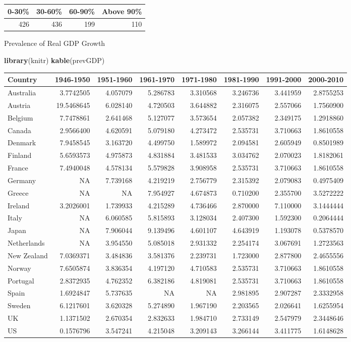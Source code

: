 \documentclass[
]{article}
\newenvironment{Shaded}{\begin{snugshade}}{\end{snugshade}}
\newcommand{\KeywordTok}[1]{\textcolor[rgb]{0.13,0.29,0.53}{\textbf{#1}}}
\newcommand{\NormalTok}[1]{#1}
\begin{document}
\begin{longtable}[]{@{}rrrr@{}}
\toprule
0-30\% & 30-60\% & 60-90\% & Above 90\%\tabularnewline
\midrule
\endhead
426 & 436 & 199 & 110\tabularnewline
\bottomrule
\end{longtable}

Prevalence of Real GDP Growth

\begin{Shaded}
\begin{Highlighting}[]
\KeywordTok{library}\NormalTok{(knitr)}
\KeywordTok{kable}\NormalTok{(prevGDP)}
\end{Highlighting}
\end{Shaded}

\begin{longtable}[]{@{}lrrrrrrr@{}}
\toprule
Country & 1946-1950 & 1951-1960 & 1961-1970 & 1971-1980 & 1981-1990 &
1991-2000 & 2000-2010\tabularnewline
\midrule
\endhead
Australia & 3.7742505 & 4.057079 & 5.286783 & 3.310568 & 3.246736 &
3.441959 & 2.8755253\tabularnewline
Austria & 19.5468645 & 6.028140 & 4.720503 & 3.644882 & 2.316075 &
2.557066 & 1.7560900\tabularnewline
Belgium & 7.7478861 & 2.641468 & 5.127077 & 3.573654 & 2.057382 &
2.349175 & 1.2918860\tabularnewline
Canada & 2.9566400 & 4.620591 & 5.079180 & 4.273472 & 2.535731 &
3.710663 & 1.8610558\tabularnewline
Denmark & 7.9458545 & 3.163720 & 4.499750 & 1.589972 & 2.094581 &
2.605949 & 0.8501989\tabularnewline
Finland & 5.6593573 & 4.975873 & 4.831884 & 3.481533 & 3.034762 &
2.070023 & 1.8182061\tabularnewline
France & 7.4940048 & 4.578134 & 5.579828 & 3.908958 & 2.535731 &
3.710663 & 1.8610558\tabularnewline
Germany & NA & 7.739168 & 4.219219 & 2.756779 & 2.315392 & 2.079083 &
0.4975409\tabularnewline
Greece & NA & NA & 7.954927 & 4.674873 & 0.710200 & 2.355700 &
3.5272222\tabularnewline
Ireland & 3.2026001 & 1.739933 & 4.215289 & 4.736466 & 2.870000 &
7.110000 & 3.1444444\tabularnewline
Italy & NA & 6.060585 & 5.815893 & 3.128034 & 2.407300 & 1.592300 &
0.2064444\tabularnewline
Japan & NA & 7.906044 & 9.139496 & 4.601107 & 4.643919 & 1.193078 &
0.5378570\tabularnewline
Netherlands & NA & 3.954550 & 5.085018 & 2.931332 & 2.254174 & 3.067691
& 1.2723563\tabularnewline
New Zealand & 7.0369371 & 3.484836 & 3.581376 & 2.239731 & 1.723000 &
2.877800 & 2.4655556\tabularnewline
Norway & 7.6505874 & 3.836354 & 4.197120 & 4.710583 & 2.535731 &
3.710663 & 1.8610558\tabularnewline
Portugal & 2.8372935 & 4.762352 & 6.382186 & 4.819081 & 2.535731 &
3.710663 & 1.8610558\tabularnewline
Spain & 1.6924847 & 5.737635 & NA & NA & 2.981895 & 2.907287 &
2.3332958\tabularnewline
Sweden & 6.1217601 & 3.620328 & 5.274890 & 1.967190 & 2.203565 &
2.026641 & 1.6255954\tabularnewline
UK & 1.1371502 & 2.670354 & 2.832633 & 1.984710 & 2.733149 & 2.547979 &
2.3448646\tabularnewline
US & 0.1576796 & 3.547241 & 4.215048 & 3.209143 & 3.266144 & 3.411775 &
1.6148628\tabularnewline
\bottomrule
\end{longtable}
\end{document}
